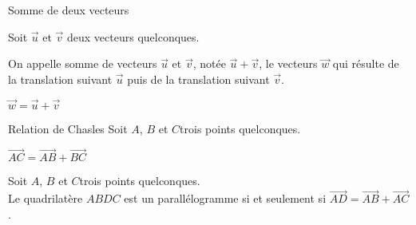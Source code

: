 \begin{titre}

\end{titre}



\begin{DefT}{Somme de deux vecteurs}
\begin{minipage}{0.48\linewidth}
Soit $\overrightarrow{u}$ et $\overrightarrow{v}$ deux vecteurs quelconques.

On appelle somme de vecteurs $\overrightarrow{u}$ et $\overrightarrow{v}$, notée $\overrightarrow{u}+\overrightarrow{v}$, le vecteurs $\overrightarrow{w}$ qui résulte de la translation suivant $\overrightarrow{u}$ puis de la translation suivant $\overrightarrow{v}$.
\end{minipage}
\hfill
\begin{minipage}{0.48\linewidth}
\end{minipage}
\end{DefT}


\begin{Nt}
$\overrightarrow{w}=\overrightarrow{u}+\overrightarrow{v}$
\end{Nt}





\begin{DefT}{Relation de Chasles}
Soit $A$, $B$ et $C$trois points quelconques.

$\overrightarrow{AC}=\overrightarrow{AB}+\overrightarrow{BC}$
\end{DefT}


\begin{Th}
Soit $A$, $B$ et $C$trois points quelconques.\\
Le quadrilatère $ABDC$ est un parallélogramme si et seulement si $\overrightarrow{AD}=\overrightarrow{AB}+\overrightarrow{AC}$.
\end{Th}



